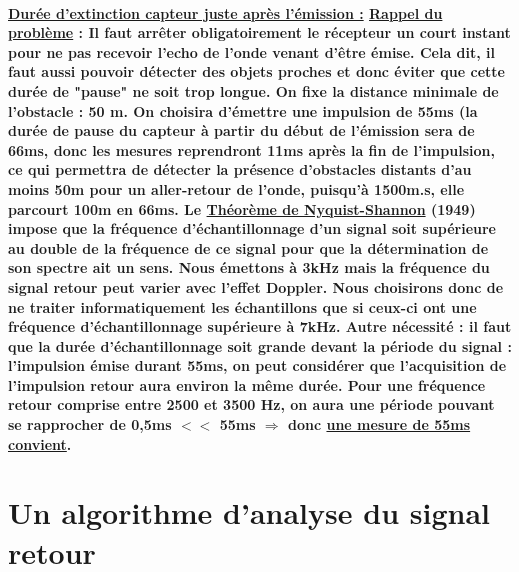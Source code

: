 \documentclass[a4paper,11pt]{article}
\begin{document}
\paragraph{\normalfont \textbf{\underline{Dur\'{e}e d'extinction capteur juste apr\`{e}s l'\'{e}mission :}}\newline
\textbf{\underline{Rappel du probl\`{e}me}} : Il faut arr\^{e}ter obligatoirement le r\'{e}cepteur un court instant pour ne pas recevoir l'echo de l'onde venant d'\^{e}tre \'{e}mise. Cela dit, \textbf{il faut aussi pouvoir d\'{e}tecter des objets proches et donc \'{e}viter que cette dur\'{e}e de "pause" ne soit trop longue}. \newline \newline
On fixe la \textbf{distance minimale de l'obstacle : 50 m}. \newline
On choisira d'\'{e}mettre une \textbf{impulsion de 55ms} (la dur\'{e}e de pause du capteur \`{a} partir du d\'{e}but de l'\'{e}mission sera de 66ms, donc les mesures reprendront 11ms apr\`{e}s la fin de l'impulsion, ce qui permettra de d\'{e}tecter la \textbf{pr\'{e}sence d'obstacles distants d'au moins 50m} pour un aller-retour de l'onde, puisqu'\`{a} 1500m.s, elle parcourt 100m en 66ms. \newline \newline
Le \textbf{\underline{Th\'{e}or\`{e}me de Nyquist-Shannon}} (1949) impose que la fr\'{e}quence d'\'{e}chantillonnage d'un signal soit sup\'{e}rieure au double de la fr\'{e}quence de ce signal pour que la d\'{e}termination de son spectre ait un sens. Nous \'{e}mettons \`{a} 3kHz mais la fr\'{e}quence du signal retour peut varier avec l'effet Doppler. Nous choisirons donc de ne traiter informatiquement les \'{e}chantillons que si ceux-ci ont une \textbf{fr\'{e}quence d'\'{e}chantillonnage sup\'{e}rieure \`{a} 7kHz}. \newline \newline
Autre n\'{e}cessit\'{e} : il faut que la \textbf{dur\'{e}e d'\'{e}chantillonnage soit grande devant la p\'{e}riode du signal} : l'impulsion \'{e}mise durant 55ms, on peut consid\'{e}rer que l'acquisition de l'impulsion retour aura environ la m\^{e}me dur\'{e}e. Pour une fr\'{e}quence retour comprise entre 2500 et 3500 Hz, on aura une p\'{e}riode pouvant se rapprocher de 0,5ms $<<$ 55ms \newline $\Rightarrow$ donc \underline{une mesure de 55ms convient}.}
\section{Un algorithme d'analyse du signal retour}
\end{document}
